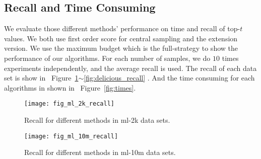 \documentclass[letterpaper]{article}
\newcommand{\Fig}[1]   {Figure~\ref{fig:#1}}
\newcommand{\Figs}[2]  {Figure~\ref{fig:#1}$\sim$\ref{fig:#2}}
\begin{document}
\subsection{Recall and Time Consuming}
We evaluate those different methods' performance on time and recall of top-$t$ values.
We both use first order score for central sampling and the extension version.
We use the maximum budget which is the full-strategy to show the performance of our algorithms.
For each number of samples, we do $10$ times experiments independently, and the average recall is used.
The recall of each data set is show in ~\Figs{ml_2k_recall}{delicious_recall} .
And the time consuming for each algorithms in shown in ~\Fig{times}.
\begin{figure}[t]
  \centering
  \texttt{[image: fig\_ml\_2k\_recall]}\\
  \caption{Recall for different methods in ml-2k data sets.}
  \label{fig:ml_2k_recall}
\end{figure}
\begin{figure}[]
  \centering
  \texttt{[image: fig\_ml\_10m\_recall]}\\
  \caption{Recall for different methods in ml-10m data sets.}
  \label{fig:ml_10m_recall}
\end{figure}
\end{document}
